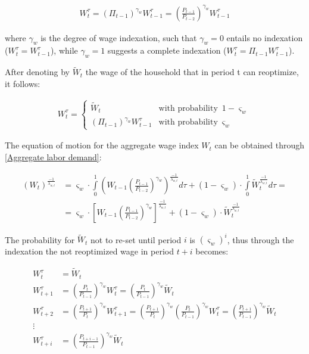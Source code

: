 \documentclass{pracamgr}
\numberwithin{equation}{section}
\begin{document}
\begin{align}
W_{t}^{\tau} = \left( \Pi_{t-1} \right)^{\gamma_{w}}W_{t-1}^{\tau} = \left( \frac{P_{t-1}}{P_{t-2}} \right)^{\gamma_{w}}W_{t-1}^{\tau}
\end{align}

where $\gamma_{w}$ is the degree of wage indexation, such that $\gamma_{w} = 0$ entails no indexation ($W_{t}^{\tau} = W_{t-1}^{\tau}$), while $\gamma_{w} = 1$ suggests a complete indexation ($W_{t}^{\tau} = \Pi_{t-1} W_{t-1}^{\tau}$).

After denoting by $\widetilde{W}_{t}$ the wage of the household that in period t can reoptimize, it follows:

\begin{align}
W_{t}^{\tau} = \begin{cases}
\widetilde{W}_{t} & \text{with probability} \enspace 1-\varsigma_{w} \\
\left( \Pi_{t-1} \right)^{\gamma_{w}}W_{t-1}^{\tau} & \text{with probability} \enspace \varsigma_{w} 
\end{cases}
\end{align}

The equation of motion for the aggregate wage index $W_{t}$ can be obtained through \ref{Aggregate labor demand}:

\begin{align}
\left(W_{t}\right)^{\frac{-1}{\lambda_{w,t}}} &= \varsigma_{w} \cdot \int\limits_{0}^{1} \left( W_{t-1}\left( \frac{P_{t-1}}{P_{t-2}} \right)^{\gamma_{w}} \right)^{\frac{-1}{\lambda_{w,t}}} d\tau + (1 - \varsigma_{w}) \cdot \int\limits_{0}^{1} \widetilde{W}_{t}^{\frac{-1}{\lambda_{w,t}}} d\tau = \nonumber \\ 
& = \varsigma_{w}\cdot \left[ W_{t-1}\left( \frac{P_{t-1}}{P_{t-2}} \right)^{\gamma_{w}} \right]^{\frac{-1}{\lambda_{w,t}}} + (1 - \varsigma_{w}) \cdot \widetilde{W}_{t}^{\frac{-1}{\lambda_{w,t}}}
\end{align}

The probability for $\widetilde{W}_{t}$ not to re-set until period $i$ is $\left( \varsigma_{w} \right)^{i}$, thus through the indexation the not reoptimized wage in period $t+i$ becomes:

\begin{align}
W_{t}^{\tau} &= \widetilde{W}_{t} \nonumber \\
W_{t+1}^{\tau} &= \left( \frac{P_{t}}{P_{t-1}} \right)^{\gamma_{w}} W_{t}^{\tau} = \left( \frac{P_{t}}{P_{t-1}} \right)^{\gamma_{w}} \widetilde{W}_{t}  \nonumber \\
W_{t+2}^{\tau} &= \left( \frac{P_{t+1}}{P_{t}} \right)^{\gamma_{w}}  W_{t+1}^{\tau} = \left( \frac{P_{t+1}}{P_{t}} \right)^{\gamma_{w}} \left( \frac{P_{t}}{P_{t-1}} \right)^{\gamma_{w}}  W_{t}^{\tau}  = \left( \frac{P_{t+1}}{P_{t-1}} \right)^{\gamma_{w}} \widetilde{W}_{t} \nonumber \\ \vdots \nonumber \\
W_{t+i}^{\tau} &= \left( \frac{P_{t+i-1}}{P_{t-1}} \right)^{\gamma_{w}} \widetilde{W}_{t} \nonumber \\
\end{align}
\end{document}
